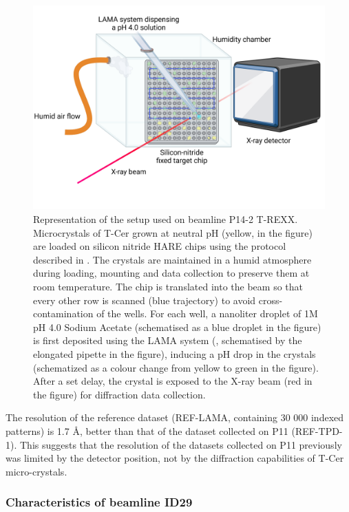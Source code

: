 \begin{figure}[H] %
    \centering
        \noindent \includegraphics[width=\textwidth]{images/T-Cer/T-REXX_LAMA.pdf}
    \hfill
    \caption{Representation of the setup used on beamline P14-2 T-REXX. Microcrystals of T-Cer grown at neutral pH (yellow, in the figure) are loaded on silicon nitride HARE chips using the protocol described in \cite{mehrabiHAREChipEfficient2020}. The crystals are maintained in a humid atmosphere during loading, mounting and data collection to preserve them at room temperature. The chip is translated into the beam so that every other row is scanned (blue trajectory) to avoid cross-contamination of the wells. For each well, a nanoliter droplet of 1M pH 4.0 Sodium Acetate (schematised as a blue droplet in the figure) is first deposited using the LAMA system (\cite{mehrabiLiquidApplicationMethod2019}, schematised by the elongated pipette in the figure), inducing a pH drop in the crystals (schematized as a colour change from yellow to green in the figure). After a set delay, the crystal is exposed to the X-ray beam (red in the figure) for diffraction data collection.}\label{fig:T-Cer_TREXX}
\end{figure}

The resolution of the reference dataset (REF-LAMA, containing 30 000 indexed patterns) is 1.7 \AA, better than that of the dataset collected on P11 (REF-TPD-1). This suggests that the resolution of the datasets collected on P11 previously was limited by the detector position, not by the diffraction capabilities of T-Cer micro-crystals.

\subsubsection{Characteristics of beamline ID29}\label{sec:presenting_ID29}

